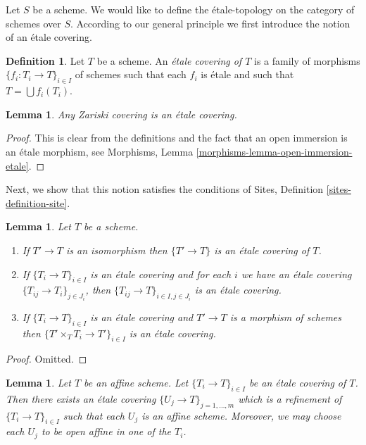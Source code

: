 \documentclass{stacks-project}
\theoremstyle{plain}
\newtheorem{lemma}[subsection]{Lemma}
\theoremstyle{definition}
\newtheorem{definition}[subsection]{Definition}
\theoremstyle{remark}
\numberwithin{equation}{subsection}
\begin{document}
\noindent
Let $S$ be a scheme. We would like to define the \'etale-topology on
the category of schemes over $S$. According to our general principle
we first introduce the notion of an \'etale covering.

\begin{definition}
\label{definition-etale-covering}
Let $T$ be a scheme. An {\it \'etale covering of $T$} is a family
of morphisms $\{f_i : T_i \to T\}_{i \in I}$ of schemes
such that each $f_i$ is \'etale and such that $T = \bigcup f_i(T_i)$.
\end{definition}

\begin{lemma}
\label{lemma-zariski-etale}
Any Zariski covering is an \'etale covering.
\end{lemma}

\begin{proof}
This is clear from the definitions and the fact that an open immersion
is an \'etale morphism, see
Morphisms, Lemma \ref{morphisms-lemma-open-immersion-etale}.
\end{proof}

\noindent
Next, we show that this notion satisfies the conditions of
Sites, Definition \ref{sites-definition-site}.

\begin{lemma}
\label{lemma-etale}
Let $T$ be a scheme.
\begin{enumerate}
\item If $T' \to T$ is an isomorphism then $\{T' \to T\}$
is an \'etale covering of $T$.
\item If $\{T_i \to T\}_{i\in I}$ is an \'etale covering and for each
$i$ we have an \'etale covering $\{T_{ij} \to T_i\}_{j\in J_i}$, then
$\{T_{ij} \to T\}_{i \in I, j\in J_i}$ is an \'etale covering.
\item If $\{T_i \to T\}_{i\in I}$ is an \'etale covering
and $T' \to T$ is a morphism of schemes then
$\{T' \times_T T_i \to T'\}_{i\in I}$ is an \'etale covering.
\end{enumerate}
\end{lemma}

\begin{proof}
Omitted.
\end{proof}

\begin{lemma}
\label{lemma-etale-affine}
Let $T$ be an affine scheme.
Let $\{T_i \to T\}_{i \in I}$ be an \'etale covering of $T$.
Then there exists an \'etale covering
$\{U_j \to T\}_{j = 1, \ldots, m}$ which is a refinement
of $\{T_i \to T\}_{i \in I}$ such that each $U_j$ is an affine
scheme. Moreover, we may choose each $U_j$ to be open affine
in one of the $T_i$.
\end{lemma}
\end{document}
